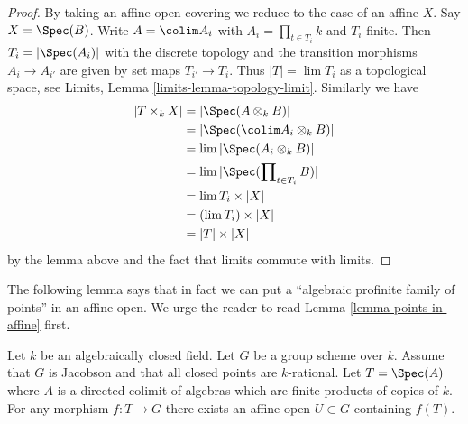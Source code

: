 \begin{proof}
By taking an affine open covering we reduce to the case of an affine $X$.
Say $X = \Spec(B)$.
Write $A = \colim A_i$ with $A_i = \prod_{t \in T_i} k$ and $T_i$ finite.
Then $T_i = |\Spec(A_i)|$ with the discrete topology and the transition
morphisms $A_i \to A_{i'}$ are given by set maps $T_{i'} \to T_i$. Thus
$|T| = \lim T_i$ as a topological space, see
Limits, Lemma \ref{limits-lemma-topology-limit}. Similarly we have
\begin{align*}
|T \times_k X| & =
|\Spec(A \otimes_k B)| \\
& =
|\Spec(\colim A_i \otimes_k B)| \\
& =
\lim |\Spec(A_i \otimes_k B)| \\
& =
\lim |\Spec(\prod\nolimits_{t \in T_i} B)| \\
& =
\lim T_i \times |X| \\
& =
(\lim T_i) \times |X| \\
& =
|T| \times |X|
\end{align*}
by the lemma above and the fact that limits commute with limits.
\end{proof}

\noindent
The following lemma says that in fact we can put a
``algebraic profinite family of points'' in an affine open.
We urge the reader to read Lemma \ref{lemma-points-in-affine} first.

\begin{lemma}
\label{lemma-compact-set-in-affine}
Let $k$ be an algebraically closed field. Let $G$ be a group scheme over $k$.
Assume that $G$ is Jacobson and that all closed points are $k$-rational.
Let $T = \Spec(A)$ where $A$ is a directed colimit of algebras which
are finite products of copies of $k$. For any morphism $f : T \to G$
there exists an affine open $U \subset G$ containing $f(T)$.
\end{lemma}

